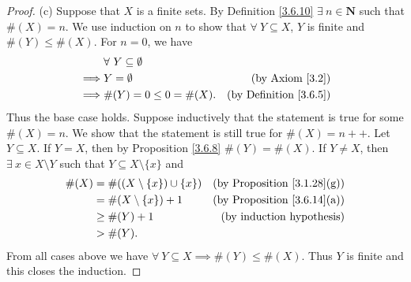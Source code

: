\begin{proof}{(c)}
    Suppose that \(X\) is a finite sets.
    By Definition \ref{3.6.10} \(\exists\ n \in \mathbf{N}\) such that \(\#(X) = n\).
    We use induction on \(n\) to show that \(\forall\ Y \subseteq X\), \(Y\) is finite and \(\#(Y) \leq \#(X)\).
    For \(n = 0\), we have
    \begin{align*}
                 & \forall\ Y \subseteq \emptyset                                      \\
        \implies & Y = \emptyset                  & \text{(by Axiom \ref{3.2})}        \\
        \implies & \#(Y) = 0 \leq 0 = \#(X).      & \text{(by Definition \ref{3.6.5})}
    \end{align*}
    Thus the base case holds.
    Suppose inductively that the statement is true for some \(\#(X) = n\).
    We show that the statement is still true for \(\#(X) = n++\).
    Let \(Y \subseteq X\).
    If \(Y = X\), then by Proposition \ref{3.6.8} \(\#(Y) = \#(X)\).
    If \(Y \neq X\), then \(\exists\ x \in X \setminus Y\) such that \(Y \subseteq X \setminus \{x\}\) and
    \begin{align*}
        \#(X) & = \#((X \setminus \{x\}) \cup \{x\}) & \text{(by Proposition \ref{3.1.28}(g))} \\
              & = \#(X \setminus \{x\}) + 1          & \text{(by Proposition \ref{3.6.14}(a))} \\
              & \geq \#(Y) + 1                       & \text{(by induction hypothesis)}        \\
              & > \#(Y).
    \end{align*}
    From all cases above we have \(\forall\ Y \subseteq X \implies \#(Y) \leq \#(X)\).
    Thus \(Y\) is finite and this closes the induction.


\end{proof}
